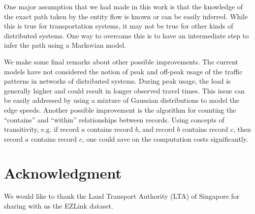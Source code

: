 \documentclass[conference]{IEEEtran.1.8}
\begin{document}
One major assumption that we had made in this work is that the knowledge of the exact path taken by the entity flow is known or can be easily inferred. While this is true for transportation systems, it may not be true for other kinds of distributed systems. One way to overcome this is to have an intermediate step to infer the path using a Markovian model. 

We make some final remarks about other possible improvements. The current models have not considered the notion of peak and off-peak usage of the traffic patterns in networks of distributed systems. During peak usage, the load is generally higher and could result in longer observed travel times. This issue can be easily addressed by using a mixture of Gaussian distributions to model the edge speeds. Another possible improvement is the algorithm for counting the ``contains'' and ``within'' relationships between records. Using concepts of transitivity, e.g. if record $a$ contains record $b$, and record $b$ contains record $c$, then record $a$ contains record $c$, one could save on the computation costs significantly.

\section*{Acknowledgment}
We would like to thank the Land Transport Authority (LTA) of Singapore for sharing with us the EZLink dataset.



\end{document}
